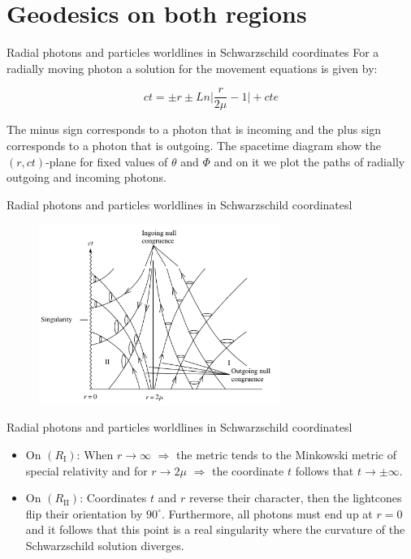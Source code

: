 \documentclass[xcolor=dvipsnames]{beamer}
\begin{document}
\section{Geodesics on both regions}
\begin{frame}{Radial photons and particles   worldlines in Schwarzschild coordinates}
For a radially moving photon a solution for the movement equations is given by:

\begin{equation*}
ct=\pm r\pm Ln\Big| \frac{r}{2\mu}-1 \Big|+cte
\end{equation*}

The minus sign corresponds to a photon that is incoming and the plus sign corresponds to a photon that is outgoing. The spacetime diagram show the $(r,ct)$-plane for fixed values of $\theta$ and $\Phi$ and on it we plot the paths of radially outgoing and incoming photons.

\end{frame}
\begin{frame}{Radial photons and particles   worldlines in Schwarzschild coordinatesl}

\begin{figure}
    \centering
    \includegraphics[width=0.7\textwidth]{Presentations/Images/4_bhphotons.png}
\end{figure}
\end{frame}

\begin{frame}{Radial photons and particles   worldlines in Schwarzschild coordinatesl}
\begin{itemize}
    \item On $(R_{\mathrm{I}})$: When $r\rightarrow \infty$ $\Rightarrow$ the metric tends to the Minkowski metric of special relativity and for $r\rightarrow 2\mu$ $\Rightarrow$ the coordinate $t$ follows that $t\rightarrow \pm\infty$.\\
    
    \item On $(R_{\mathrm{II}})$: Coordinates $t$ and $r$ reverse their character, then the lightcones flip their orientation by $90^{\circ}$. Furthermore, all photons must end up at $r=0$ and it follows that this point is a real singularity where the curvature of the Schwarzschild solution diverges.
\end{itemize}




\end{frame}
\end{document}
